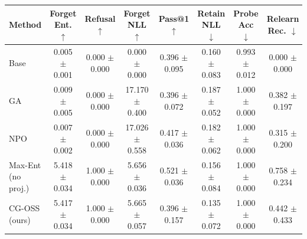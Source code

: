 \begin{tabular}{lccccccc}
\toprule
Method & Forget Ent. $\uparrow$ & Refusal $\uparrow$ & Forget NLL $\uparrow$ & Pass@1 $\uparrow$ & Retain NLL $\downarrow$ & Probe Acc $\downarrow$ & Relearn Rec. $\downarrow$ \\
\midrule
Base & 0.005 $\pm$ 0.001 & 0.000 $\pm$ 0.000 & 0.000 $\pm$ 0.000 & 0.396 $\pm$ 0.095 & 0.160 $\pm$ 0.083 & 0.993 $\pm$ 0.012 & 0.000 $\pm$ 0.000 \\
GA & 0.009 $\pm$ 0.005 & 0.000 $\pm$ 0.000 & 17.170 $\pm$ 0.400 & 0.396 $\pm$ 0.072 & 0.187 $\pm$ 0.052 & 1.000 $\pm$ 0.000 & 0.382 $\pm$ 0.197 \\
NPO & 0.007 $\pm$ 0.002 & 0.000 $\pm$ 0.000 & 17.026 $\pm$ 0.558 & 0.417 $\pm$ 0.036 & 0.182 $\pm$ 0.062 & 1.000 $\pm$ 0.000 & 0.315 $\pm$ 0.200 \\
Max-Ent (no proj.) & 5.418 $\pm$ 0.034 & 1.000 $\pm$ 0.000 & 5.656 $\pm$ 0.036 & 0.521 $\pm$ 0.036 & 0.156 $\pm$ 0.084 & 1.000 $\pm$ 0.000 & 0.758 $\pm$ 0.234 \\
CG-OSS (ours) & 5.417 $\pm$ 0.034 & 1.000 $\pm$ 0.000 & 5.665 $\pm$ 0.057 & 0.396 $\pm$ 0.157 & 0.135 $\pm$ 0.072 & 1.000 $\pm$ 0.000 & 0.442 $\pm$ 0.433 \\
\bottomrule
\end{tabular}
